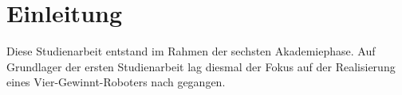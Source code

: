 \chapter{Einleitung}

Diese Studienarbeit entstand im Rahmen der sechsten Akademiephase. Auf Grundlager der ersten Studienarbeit lag diesmal der Fokus auf der Realisierung eines Vier-Gewinnt-Roboters nach gegangen.  